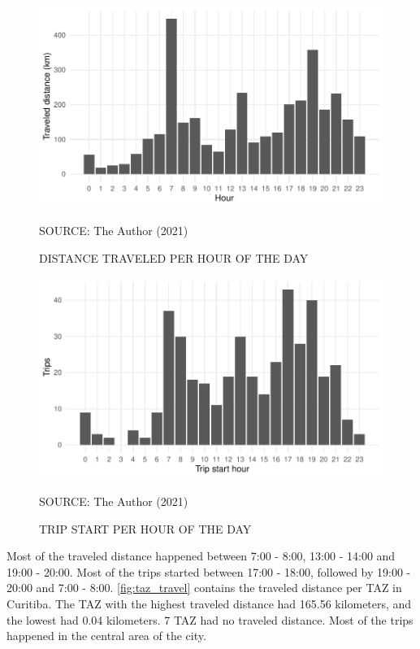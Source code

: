\begin{figure}[!htbp]
    \centering\footnotesize
    \captionsetup{font=footnotesize}
    \caption{DISTANCE TRAVELED PER HOUR OF THE DAY}
    \includegraphics{fig/hotd_dist.pdf}
    \label{fig:hotd_dist}
    \par SOURCE: The Author (2021)
\end{figure}


\begin{figure}[!htbp]
    \centering\footnotesize
    \captionsetup{font=footnotesize}
    \caption{TRIP START PER HOUR OF THE DAY}
    \includegraphics{fig/hotd_trip.pdf}
    \label{fig:hotd_trips}
    \par SOURCE: The Author (2021)
\end{figure}

Most of the traveled distance happened between 7:00 - 8:00, 13:00 - 14:00 and 19:00 - 20:00. Most of the trips started between 17:00 - 18:00, followed by 19:00 - 20:00 and 7:00 - 8:00. \autoref{fig:taz_travel} contains the traveled distance per TAZ in Curitiba. The TAZ with the highest traveled distance had 165.56 kilometers, and the lowest had 0.04 kilometers. 7 TAZ had no traveled distance. Most of the trips happened in the central area of the city.

